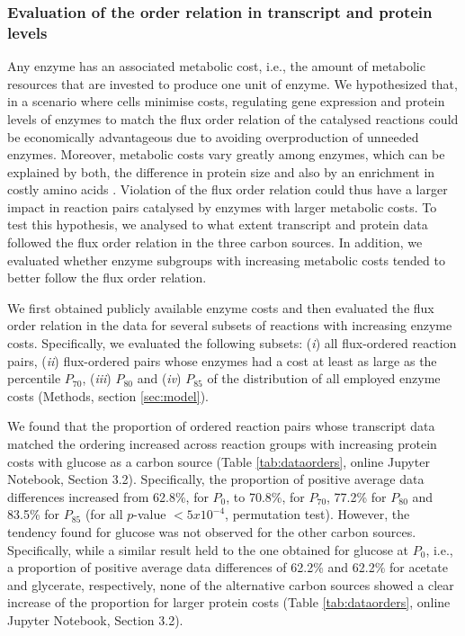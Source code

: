 \documentclass[12pt]{article}
\begin{document}
\subsubsection{Evaluation of the order relation in transcript and protein levels}
Any enzyme has an associated metabolic cost, i.e., the amount of metabolic resources that are invested to produce one unit of enzyme. We hypothesized that, in a scenario where cells minimise costs, regulating gene expression and protein levels of enzymes to match the flux order relation of the catalysed reactions could be economically advantageous due to avoiding overproduction of unneeded enzymes. Moreover, metabolic costs vary greatly among enzymes, which can be explained by both, the difference in protein size and also by an enrichment in costly amino acids \cite{Noor2016}. Violation of the flux order relation could thus have a larger impact in reaction pairs catalysed by enzymes with larger metabolic costs. To test this hypothesis, we analysed to what extent transcript and protein data followed the flux order relation in the three carbon sources. In addition, we evaluated whether enzyme subgroups with increasing metabolic costs tended to better follow the flux order relation.

We first obtained publicly available enzyme costs \cite{Kaleta2013} and then evaluated the flux order relation in the data for several subsets of reactions with increasing enzyme costs. Specifically, we evaluated the following subsets: (\emph{i}) all flux-ordered reaction pairs, (\emph{ii}) flux-ordered pairs whose enzymes had a cost at least as large as the percentile $P_{70}$, (\emph{iii}) $P_{80}$ and (\emph{iv}) $P_{85}$ of the distribution of all employed enzyme costs (Methods, section \ref{sec:model}).

We found that the proportion of ordered reaction pairs whose transcript data matched the ordering increased across reaction groups with increasing protein costs with glucose as a carbon source (Table \ref{tab:dataorders}, online Jupyter Notebook, Section 3.2). Specifically, the proportion of positive average data differences increased from 62.8\%, for $P_{0}$, to 70.8\%, for $P_{70}$, 77.2\% for $P_{80}$ and 83.5\% for $P_{85}$ (for all $p$-value $< 5x10^{-4}$, permutation test). However, the tendency found for glucose was not observed for the other carbon sources. Specifically, while a similar result held to the one obtained for glucose at $P_{0}$, i.e., a proportion of positive average data differences of 62.2\% and 62.2\% for acetate and glycerate, respectively, none of the alternative carbon sources showed a clear increase of the proportion for larger protein costs (Table \ref{tab:dataorders}, online Jupyter Notebook, Section 3.2).
\end{document}
